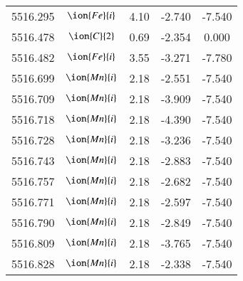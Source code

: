 \documentclass[fleqn,usenatbib]{mnras}
\begin{document}
\begin{center}
\begin{table}
\begin{tabular}{ccccc}
5516.295 &  $\ion{Fe}{i}$  & 4.10 & -2.740 & -7.540 \\ 
5516.478 &  $\ion{C}{2}$ & 0.69 & -2.354 & 0.000 \\ 
5516.482 &  $\ion{Fe}{i}$  & 3.55 & -3.271 & -7.780 \\ 
5516.699 &  $\ion{Mn}{i}$  & 2.18 & -2.551 & -7.540 \\ 
5516.709 &  $\ion{Mn}{i}$  & 2.18 & -3.909 & -7.540 \\ 
5516.718 &  $\ion{Mn}{i}$  & 2.18 & -4.390 & -7.540 \\ 
5516.728 &  $\ion{Mn}{i}$  & 2.18 & -3.236 & -7.540 \\ 
5516.743 &  $\ion{Mn}{i}$  & 2.18 & -2.883 & -7.540 \\ 
5516.757 &  $\ion{Mn}{i}$  & 2.18 & -2.682 & -7.540 \\ 
5516.771 &  $\ion{Mn}{i}$  & 2.18 & -2.597 & -7.540 \\ 
5516.790 &  $\ion{Mn}{i}$  & 2.18 & -2.849 & -7.540 \\ 
5516.809 &  $\ion{Mn}{i}$  & 2.18 & -3.765 & -7.540 \\ 
5516.828 &  $\ion{Mn}{i}$  & 2.18 & -2.338 & -7.540 \\ 
 \end{tabular}
 \end{table}
 \end{center}
\end{document}

